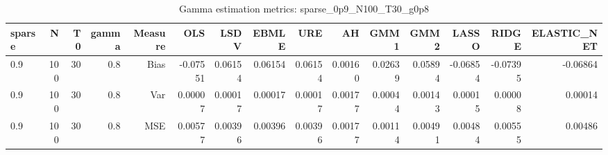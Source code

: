 \begin{table}[!htbp]\centering
\caption{Gamma estimation metrics: sparse_0p9_N100_T30_g0p8}
\label{tab:table1_sparse_0p9_N100_T30_g0p8}
\begin{tabular}{lrrrrrrrrrrrrrr}
\hline
sparse & N & T0 & gamma & Measure & OLS & LSDV & EBMLE & URE & AH & GMM1 & GMM2 & LASSO & RIDGE & ELASTIC_NET \\
\hline
0.9 & 100 & 30 & 0.8 & Bias & -0.07551 & 0.06154 & 0.06154 & 0.06154 & 0.00160 & 0.02639 & 0.05894 & -0.06854 & -0.07395 & -0.06864 \\
0.9 & 100 & 30 & 0.8 & Var & 0.00007 & 0.00017 & 0.00017 & 0.00017 & 0.00177 & 0.00044 & 0.00143 & 0.00015 & 0.00008 & 0.00014 \\
0.9 & 100 & 30 & 0.8 & MSE & 0.00577 & 0.00396 & 0.00396 & 0.00396 & 0.00177 & 0.00114 & 0.00491 & 0.00484 & 0.00555 & 0.00486 \\
\hline
\end{tabular}
\end{table}

